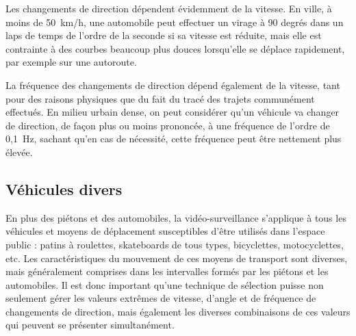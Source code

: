	Les changements de direction dépendent évidemment de la vitesse. En ville, à moins de 50~km/h, une automobile peut effectuer un virage à 90 degrés dans un laps de temps de l'ordre de la seconde si sa vitesse est réduite, mais elle est contrainte à des courbes beaucoup plus douces lorsqu'elle se déplace rapidement, par exemple sur une autoroute.
	
	La fréquence des changements de direction dépend également de la vitesse, tant pour des raisons physiques que du fait du tracé des trajets communément effectués. En milieu urbain dense, on peut considérer qu'un véhicule va changer de direction, de façon plus ou moins prononcée, à une fréquence de l'ordre de 0,1~Hz, sachant qu'en cas de nécessité, cette fréquence peut être nettement plus élevée.
	
	\FloatBarrier \subsection{Véhicules divers}
	En plus des piétons et des automobiles, la vidéo-surveillance s'applique à tous les véhicules et moyens de déplacement susceptibles d'être utilisés dans l'espace public : patins à roulettes, skateboards de tous types, bicyclettes, motocyclettes, etc. Les caractéristiques du mouvement de ces moyens de transport sont diverses, mais généralement comprises dans les intervalles formés par les piétons et les automobiles. Il est donc important qu'une technique de sélection puisse non seulement gérer les valeurs extrêmes de vitesse, d'angle et de fréquence de changements de direction, mais également les diverses combinaisons de ces valeurs qui peuvent se présenter simultanément.
		
